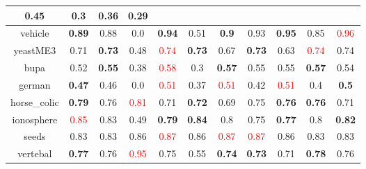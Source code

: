 \documentclass{article}%
\begin{document}
\begin{tabular}{c|cccccccccc}
{0.45
}&0.3&\textbf{0.36}&0.29\\%
\hline%
vehicle&\textbf{0.89}&0.88&0.0&\textbf{0.94}&0.51&\textbf{0.9}&0.93&\textbf{0.95}&0.85&\textcolor{red}{ 
0.96
}\\%
\hline%
yeastME3&0.71&\textbf{0.73}&0.48&\textcolor{red}{ 
0.74
}&\textbf{0.73}&0.67&\textbf{0.73}&0.63&\textcolor{red}{ 
0.74
}&0.74\\%
\hline%
bupa&0.52&\textbf{0.55}&0.38&\textcolor{red}{ 
0.58
}&0.3&\textbf{0.57}&0.55&0.55&\textbf{0.57}&0.54\\%
\hline%
german&\textbf{0.47}&0.46&0.0&\textcolor{red}{ 
0.51
}&0.37&\textcolor{red}{ 
0.51
}&0.42&\textcolor{red}{ 
0.51
}&0.4&\textbf{0.5}\\%
\hline%
horse\_colic&\textbf{0.79}&0.76&\textcolor{red}{ 
0.81
}&0.71&\textbf{0.72}&0.69&0.75&\textbf{0.76}&\textbf{0.76}&0.71\\%
\hline%
ionosphere&\textcolor{red}{ 
0.85
}&0.83&0.49&\textbf{0.79}&\textbf{0.84}&0.8&0.75&\textbf{0.77}&0.8&\textbf{0.82}\\%
\hline%
seeds&0.83&0.83&0.86&\textcolor{red}{ 
0.87
}&0.86&\textcolor{red}{ 
0.87
}&\textcolor{red}{ 
0.87
}&0.86&0.83&0.83\\%
\hline%
vertebal&\textbf{0.77}&0.76&\textcolor{red}{ 
0.95
}&0.75&0.55&\textbf{0.74}&\textbf{0.73}&0.71&\textbf{0.78}&0.76\\%
\hline%
\end{tabular}

%
\end{document}
